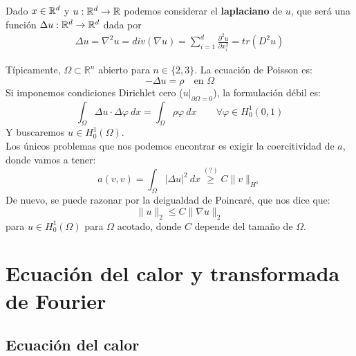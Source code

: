 \documentclass[12pt]{book}
\begin{document}
    \begin{definicion}
        Dado $x\in \mathbb{R}^d$ y $u:\mathbb{R}^d \to \mathbb{R}$ podemos considerar el \textbf{laplaciano} de $u$, que será una función $\Delta u :\mathbb{R}^d \to \mathbb{R}^d$ dada por 
        \begin{gather*}
            \Delta u = \nabla^2 u = div(\nabla u) = \sum_{i=1}^d \frac{\partial^2 u}{\partial x_i^2} = tr(D^2u)
        \end{gather*}
    \end{definicion}

    Típicamente, $\Omega\subset\mathbb{R}^n$ abierto para $n\in \{2,3\}$. La ecuación de Poisson es:
    \begin{equation*}
        -\Delta u = \rho \quad \text{en\ } \Omega
    \end{equation*}
    Si imponemos condiciones Dirichlet cero ($u\big|_{\partial \Omega=0}$), la formulación débil es:
    \begin{equation*}
        \int_\Omega \Delta u \cdot \Delta \varphi~dx = \int_{\Omega}\rho \varphi ~dx \qquad \forall \varphi \in H^1_0(0,1)
    \end{equation*}
    Y buscaremos $u\in H^1_0(\Omega)$.\\

    \noindent
    Los únicos problemas que nos podemos encontrar es exigir la coercitividad de $a$, donde vamos a tener:
    \begin{equation*}
        a(v,v) = \int_\Omega |\Delta u|^2~dx \stackrel{(?)}{\geq} C\|v\|_{H^1}
    \end{equation*}
    De nuevo, se puede razonar por la deigualdad de Poincaré, que nos dice que:
    \begin{equation*}
        \|u\|_2 \leq C\|\nabla u\|_2 
    \end{equation*}
    para $u\in H^1_0(\Omega)$ para $\Omega$ acotado, donde $C$ depende del tamaño de $\Omega$.

    \section{Ecuación del calor y transformada de Fourier}

    \subsection{Ecuación del calor}
\end{document}
